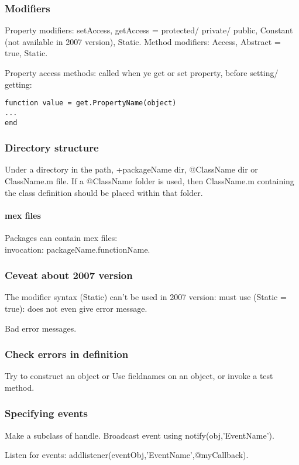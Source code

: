 \documentclass[oneside, article]{memoir}
\begin{document}
\subsubsection{Modifiers}
Property modifiers: setAccess, getAccess = protected/ private/ public, Constant (not available in 2007 version), Static. Method modifiers: Access, Abstract = true, Static.

Property access methods: called when ye get or set property, before setting/ getting:
\begin{verbatim}
function value = get.PropertyName(object)
...
end
\end{verbatim}

\subsubsection{Directory structure}
Under a directory in the path, +packageName dir, @ClassName dir or ClassName.m file. If a @ClassName folder is used, then ClassName.m containing the class definition should be placed within that folder.

\paragraph*{mex files}
Packages can contain mex files: \\
invocation: packageName.functionName.

\subsubsection{Ceveat about 2007 version}
The modifier syntax (Static) can't be used in 2007 version: must use (Static = true): does not even give error message.

Bad error messages.

\subsubsection{Check errors in definition}
Try to construct an object or Use fieldnames on an object, or invoke a test method.

\subsubsection{Specifying events}
Make a subclass of handle. Broadcast event using notify(obj,'EventName').

Listen for events: addlistener(eventObj,'EventName',@myCallback).
\end{document}
